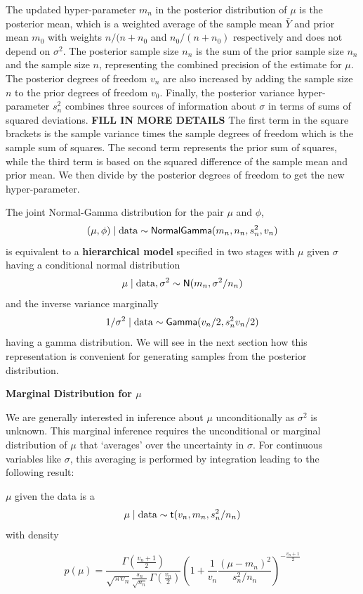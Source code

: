 \documentclass[]{book}
\theoremstyle{definition}
\theoremstyle{definition}
\theoremstyle{definition}
\theoremstyle{remark}
\begin{document}
The updated hyper-parameter \(m_n\) in the posterior distribution of
\(\mu\) is the posterior mean, which is a weighted average of the sample
mean \(\bar{Y}\) and prior mean \(m_0\) with weights \(n/(n + n_0\) and
\(n_0/(n + n_0)\) respectively and does not depend on \(\sigma^2\). The
posterior sample size \(n_n\) is the sum of the prior sample size
\(n_n\) and the sample size \(n\), representing the combined precision
of the estimate for \(\mu\). The posterior degrees of freedom \(v_n\)
are also increased by adding the sample size \(n\) to the prior degrees
of freedom \(v_0\). Finally, the posterior variance hyper-parameter
\(s^2_n\) combines three sources of information about \(\sigma\) in
terms of sums of squared deviations. \textbf{FILL IN MORE DETAILS} The
first term in the square brackets is the sample variance times the
sample degrees of freedom which is the sample sum of squares. The second
term represents the prior sum of squares, while the third term is based
on the squared difference of the sample mean and prior mean. We then
divide by the posterior degrees of freedom to get the new
hyper-parameter.

The joint Normal-Gamma distribution for the pair \(\mu\) and \(\phi\),
\[(\mu, \phi) \mid \text{data} \sim \textsf{NormalGamma}(m_n, n_n, s^2_n, v_n)\] is
equivalent to a \textbf{hierarchical model} specified in two stages with
\(\mu\) given \(\sigma\) having a conditional normal distribution
\[\mu \mid \text{data}, \sigma^2  \sim  \textsf{N}(m_n, \sigma^2/n_n)\] and the
inverse variance marginally \[
1/\sigma^2 \mid \text{data}   \sim   \textsf{Gamma}(v_n/2, s^2_n v_n/2) 
\] having a gamma distribution. We will see in the next section how this
representation is convenient for generating samples from the posterior
distribution.

\textbf{Marginal Distribution for \(\mu\)}

We are generally interested in inference about \(\mu\) unconditionally
as \(\sigma^2\) is unknown. This marginal inference requires the
unconditional or marginal distribution of \(\mu\) that `averages' over
the uncertainty in \(\sigma\). For continuous variables like \(\sigma\),
this averaging is performed by integration leading to the following
result:

\(\mu\) given the data is a 
\[ \mu \mid \text{data} \sim \textsf{t}(v_n, m_n, s^2_n/n_n)  \] with density

\begin{equation}
p(\mu) =\frac{\Gamma\left(\frac{v_n + 1}{2} \right)}
{\sqrt{\pi v_n} \frac{s_n}{\sqrt{n_n}} \,\Gamma\left(\frac{v_n}{2} \right)}
\left(1 + \frac{1}{v_n}\frac{(\mu - m_n)^2} {s^2_n/n_n} \right)^{-\frac{v_n+1}{2}} 
\label{eq:Student-t-density}
\end{equation}
\end{document}
